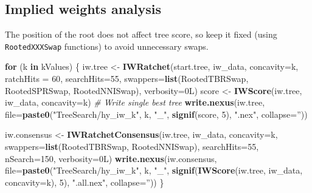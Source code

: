 \documentclass[]{book}
\newenvironment{Shaded}{\begin{snugshade}}{\end{snugshade}}
\newcommand{\KeywordTok}[1]{\textcolor[rgb]{0.13,0.29,0.53}{\textbf{#1}}}
\newcommand{\DataTypeTok}[1]{\textcolor[rgb]{0.13,0.29,0.53}{#1}}
\newcommand{\DecValTok}[1]{\textcolor[rgb]{0.00,0.00,0.81}{#1}}
\newcommand{\StringTok}[1]{\textcolor[rgb]{0.31,0.60,0.02}{#1}}
\newcommand{\CommentTok}[1]{\textcolor[rgb]{0.56,0.35,0.01}{\textit{#1}}}
\newcommand{\ControlFlowTok}[1]{\textcolor[rgb]{0.13,0.29,0.53}{\textbf{#1}}}
\newcommand{\NormalTok}[1]{#1}
\theoremstyle{definition}
\theoremstyle{definition}
\theoremstyle{definition}
\theoremstyle{remark}
\begin{document}
\hypertarget{implied-weights-analysis}{%
\subsection{Implied weights analysis}\label{implied-weights-analysis}}

The position of the root does not affect tree score, so keep it fixed
(using \texttt{RootedXXXSwap} functions) to avoid unnecessary swaps.

\begin{Shaded}
\begin{Highlighting}[]
\ControlFlowTok{for}\NormalTok{ (k }\ControlFlowTok{in}\NormalTok{ kValues) \{}
\NormalTok{  iw.tree <-}\StringTok{ }\KeywordTok{IWRatchet}\NormalTok{(start.tree, iw_data, }\DataTypeTok{concavity=}\NormalTok{k,}
                       \DataTypeTok{ratchHits =} \DecValTok{60}\NormalTok{, }\DataTypeTok{searchHits=}\DecValTok{55}\NormalTok{,}
                       \DataTypeTok{swappers=}\KeywordTok{list}\NormalTok{(RootedTBRSwap, RootedSPRSwap, RootedNNISwap),}
                       \DataTypeTok{verbosity=}\NormalTok{0L)}
\NormalTok{  score <-}\StringTok{ }\KeywordTok{IWScore}\NormalTok{(iw.tree, iw_data, }\DataTypeTok{concavity=}\NormalTok{k)}
  \CommentTok{# Write single best tree}
  \KeywordTok{write.nexus}\NormalTok{(iw.tree,}
              \DataTypeTok{file=}\KeywordTok{paste0}\NormalTok{(}\StringTok{"TreeSearch/hy_iw_k"}\NormalTok{, k, }\StringTok{"_"}\NormalTok{, }
                          \KeywordTok{signif}\NormalTok{(score, }\DecValTok{5}\NormalTok{), }\StringTok{".nex"}\NormalTok{, }\DataTypeTok{collapse=}\StringTok{''}\NormalTok{))}

\NormalTok{  iw.consensus <-}\StringTok{ }\KeywordTok{IWRatchetConsensus}\NormalTok{(iw.tree, iw_data, }\DataTypeTok{concavity=}\NormalTok{k,}
                  \DataTypeTok{swappers=}\KeywordTok{list}\NormalTok{(RootedTBRSwap, RootedNNISwap),}
                  \DataTypeTok{searchHits=}\DecValTok{55}\NormalTok{,}
                  \DataTypeTok{nSearch=}\DecValTok{150}\NormalTok{, }\DataTypeTok{verbosity=}\NormalTok{0L)}
  \KeywordTok{write.nexus}\NormalTok{(iw.consensus, }
              \DataTypeTok{file=}\KeywordTok{paste0}\NormalTok{(}\StringTok{"TreeSearch/hy_iw_k"}\NormalTok{, k, }\StringTok{"_"}\NormalTok{, }
                          \KeywordTok{signif}\NormalTok{(}\KeywordTok{IWScore}\NormalTok{(iw.tree, iw_data, }\DataTypeTok{concavity=}\NormalTok{k), }\DecValTok{5}\NormalTok{),}
                          \StringTok{".all.nex"}\NormalTok{, }\DataTypeTok{collapse=}\StringTok{''}\NormalTok{))}
\NormalTok{\}}
\end{Highlighting}
\end{Shaded}
\end{document}
